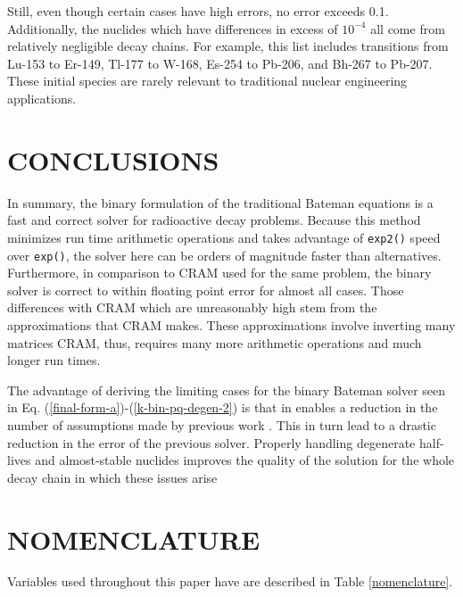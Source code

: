 \documentclass[letterpaper]{physor2018}
\begin{document}
Still, even though certain cases have high errors, no error exceeds 0.1.
Additionally, the nuclides which have differences in excess of $10^{-4}$
all come from relatively negligible decay chains. For example, this
list includes transitions from Lu-153 to Er-149, Tl-177 to W-168, Es-254 to
Pb-206, and Bh-267 to Pb-207. These initial species are rarely relevant
to traditional nuclear engineering applications.


\section{CONCLUSIONS}
\label{sec-conc}

In summary, the binary formulation of the traditional Bateman equations
is a fast and correct solver for radioactive decay problems. Because this
method minimizes run time arithmetic operations and takes advantage of
\texttt{exp2()} speed over \texttt{exp()}, the solver here can be orders of
magnitude faster than alternatives. Furthermore, in comparison to CRAM used
for the same problem, the binary solver is correct to within floating point
error for almost all cases. Those differences with CRAM which are
unreasonably high stem from the approximations that CRAM makes. These
approximations involve inverting many matrices CRAM, thus, requires many
more arithmetic operations and much longer run times.

The advantage of deriving the limiting cases for the binary Bateman solver
seen in Eq. (\ref{final-form-a})-(\ref{k-bin-pq-degen-2}) is that in enables
a reduction in the number of assumptions made by previous work
\cite{scopatz2015decay}. This in turn lead to a drastic reduction in the
error of the previous solver. Properly handling degenerate half-lives and
almost-stable nuclides improves the quality of the solution for the whole
decay chain in which these issues arise

\section*{NOMENCLATURE}
\label{sec-nomen}

Variables used throughout this paper have are described in Table \ref{nomenclature}.
\end{document}
